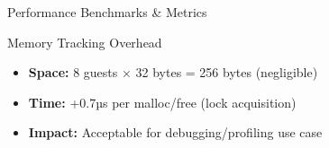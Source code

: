 \documentclass[aspectratio=169, 10pt]{beamer}
\begin{document}
\begin{frame}{Performance Benchmarks \& Metrics}
    \vspace{0.3cm}
    \begin{alertblock}{Memory Tracking Overhead}
        \begin{itemize}\setlength{\itemsep}{2pt}
            \item \textbf{Space:} 8 guests × 32 bytes = 256 bytes (negligible)
            \item \textbf{Time:} +0.7µs per malloc/free (lock acquisition)
            \item \textbf{Impact:} Acceptable for debugging/profiling use case
        \end{itemize}
    \end{alertblock}
\end{frame}

\end{document}

